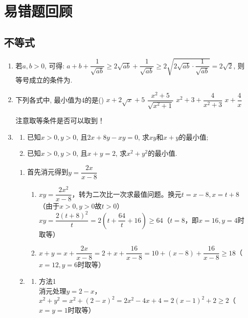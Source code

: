 \chapter*{易错题回顾} %

\section*{不等式}
\begin{enumerate}
    \item 若$a,b>0$, 可得: $a+b+\dfrac{1}{\sqrt{ab}}\geq 2\sqrt{ab}+\dfrac{1}{\sqrt{ab}}\geq 2\sqrt{2\sqrt{ab}\cdot\dfrac{1}{\sqrt{ab}}}=2\sqrt2$, 
则等号成立的条件为. 
    \item 下列各式中, 最小值为4的是\dotfill()
    \xx
    {$x+2\sqrt{x}+5$}
    {$\dfrac{x^2+5}{\sqrt{x^2+1}}$}
    {$x^2+3+\dfrac{4}{x^2+3}$}
    {$x+\dfrac{4}{x}$}
    \begin{jieda}
        注意取等条件是否可以取到！
    \end{jieda}
    \item
    \begin{enumerate}[(1)]
        \item 已知$x>0,y>0$, 且$2x+8y-xy=0$, 求$xy$和$x+y$的最小值; 
        \item 已知$x>0,y>0$, 且$x+y=2$, 求$x^2+y^2$的最小值. 
    \end{enumerate}
    \begin{jieda}
        \begin{enumerate}[(1)]
            \item 首先消元得到$y = \dfrac{2x}{x-8}$
            \begin{enumerate}
                \item $xy = \dfrac{2x^2}{x-8}$，转为二次比一次求最值问题。换元$t = x-8, x = t + 8$（由于$x>0, y>0$故$t > 0$）\\
                $xy = \dfrac{2(t+8)^2}{t} = 2(t + \dfrac{64}{t} + 16) \geq 64$（$t = 8$，即$x = 16, y = 4$时取等）
                \item $x+y = x + \dfrac{2x}{x-8} = 2 + x + \dfrac{16}{x-8} = 10 + (x-8) + \dfrac{16}{x-8} \geq 18$（$x = 12, y = 6$时取等）
            \end{enumerate}
            \item 
            \begin{enumerate}
                \item 方法1 \\
                消元处理$y = 2-x$，$x^2 + y^2 = x^2 + (2-x)^2 = 2x^2 - 4x + 4 = 2(x-1)^2+2 \geq 2$（$x = y = 1$时取等）

\end{enumerate}
\end{enumerate}
\end{jieda}
\end{enumerate}
